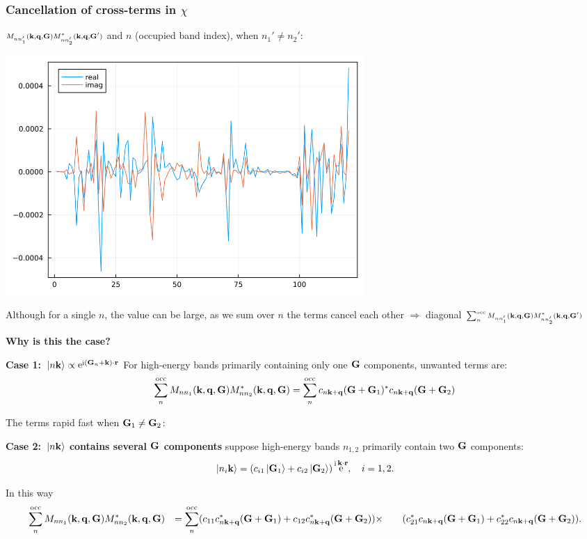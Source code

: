\documentclass[t,aspectratio=169]{beamer}
\DeclareMathOperator{\ee}{e}
\DeclareMathOperator{\ii}{i}
\def\\{}%
\begin{document}
\begin{frame}[allowframebreaks]
\frametitle{Cancellation of cross-terms in $\chi$}

$\scriptstyle M_{n n'_1} (\vb{k}, \vb{q}, \vb{G}) M^*_{nn'_2} (\vb{k}, \vb{q}, \vb{G}')$ and $n$ (occupied band index), when $n_1' \neq n_2'$:
\begin{center}
    \includegraphics[width=0.6\textwidth]{../data/chi/nc-n1-2000-n2-1000-nv-1-120-k_idx-12-q_idx-37-G_idx-200.png}
\end{center}

\faHandPointRight Although for a single $n$, the value can be large, 
as we sum over $n$ the terms cancel each other $\Rightarrow$
diagonal $\scriptstyle \sum_{n}^{\text{occ}} M_{n n'_1} (\vb{k}, \vb{q}, \vb{G}) M^*_{nn'_2} (\vb{k}, \vb{q}, \vb{G}')$

\textbf{Why is this the case?}

\textbf{Case 1: $\ket*{n \vb{k}} \propto \ee^{\ii (\vb{G}_n + \vb{k}) \cdot \vb{r}}$} For high-energy bands primarily containing only one $\vb{G}$ components, 
unwanted terms are:
\[
    \sum_n^{\text{occ}} M_{n n_1} (\vb{k}, \vb{q}, \vb{G}) M^*_{nn_2} (\vb{k}, \vb{q}, \vb{G})
    = \sum_n^{\text{occ}} c_{n \vb{k}+\vb{q}}(\vb{G} + \vb{G}_1)^* c_{n \vb{k} + \vb{q}}(\vb{G} + \vb{G}_2)
\]

The terms rapid fast when $\vb{G}_1 \neq \vb{G}_2$:

\framebreak

\textbf{Case 2: $\ket*{n \vb{k}}$ contains several $\vb{G}$ components} suppose high-energy bands $n_{1, 2}$ primarily contain two $\vb{G}$ components:
\begin{equation}
    \ket*{n_{i} \vb{k}} = (c_{i1} \ket*{\vb{G}_1} + c_{i2} \ket*{\vb{G}_2})  \ee^{\ii \vb{k} \cdot \vb{r}}, \quad i = 1, 2.
\end{equation}

In this way 
\[
    \begin{aligned}
        &\quad \sum_n^{\text{occ}} M_{n n_1} (\vb{k}, \vb{q}, \vb{G}) M^*_{nn_2} (\vb{k}, \vb{q}, \vb{G}) \\
        &= \sum_n^{\text{occ}} (c_{11} c_{n \vb{k} + \vb{q}}^*(\vb{G} + \vb{G}_1) 
        + c_{12} c_{n \vb{k} + \vb{q}}^*(\vb{G} + \vb{G}_2) ) \times \\
         &\quad \quad (c_{21}^* c_{n \vb{k} + \vb{q}}(\vb{G} + \vb{G}_1) 
         + c_{22}^* c_{n \vb{k} + \vb{q}}(\vb{G} + \vb{G}_2)).
    \end{aligned}
\]


\end{frame}
\end{document}
